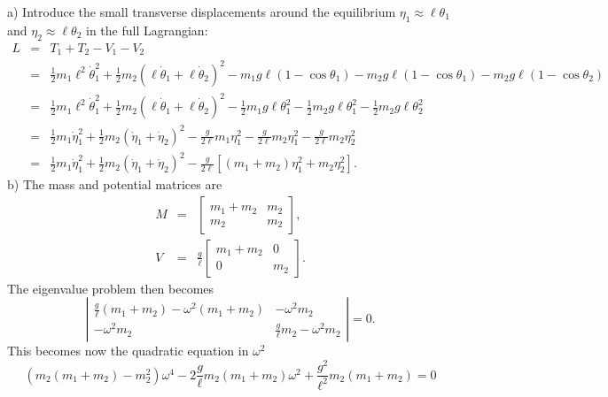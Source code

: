 \documentclass[letterpaper,11pt]{article}
\begin{document}
a) Introduce the small transverse displacements around the equilibrium $\eta_1 \approx \ell\theta_1$ and $\eta_2 \approx \ell\theta_2$ in the full Lagrangian:
\begin{eqnarray*}
 L & = & T_1 + T_2 - V_1 - V_2 \\
 & = & \frac{1}{2}m_1 \ell^2\dot\theta_1^2 + \frac{1}{2}m_2 (\ell\dot\theta_1 + \ell\dot\theta_2)^2 - m_1g\ell(1 - \cos\theta_1) - m_2g\ell(1 - \cos\theta_1) - m_2g\ell(1 - \cos\theta_2) \\
 & = & \frac{1}{2}m_1 \ell^2\dot\theta_1^2 + \frac{1}{2}m_2 (\ell\dot\theta_1 + \ell\dot\theta_2)^2 - \frac{1}{2}m_1g\ell\theta_1^2 - \frac{1}{2}m_2g\ell\theta_1^2 - \frac{1}{2}m_2g\ell\theta_2^2 \\
 & = & \frac{1}{2}m_1 \dot\eta_1^2 + \frac{1}{2}m_2 (\dot\eta_1 + \dot\eta_2)^2 - \frac{g}{2\ell}m_1\eta_1^2 - \frac{g}{2\ell}m_2\eta_1^2 - \frac{g}{2\ell}m_2\eta_2^2 \\
 & = & \frac{1}{2}m_1 \dot\eta_1^2 + \frac{1}{2}m_2 (\dot\eta_1 + \dot\eta_2)^2 - \frac{g}{2\ell}\left[ (m_1+m_2)\eta_1^2 + m_2\eta_2^2\right].
\end{eqnarray*}
b) The mass and potential matrices are
\begin{eqnarray*}
 M & = & \left[ \begin{array}{cc}
          m_1 + m_2 & m_2 \\
          m_2 & m_2
         \end{array} \right], \\
 V & = & \frac{g}{\ell}
         \left[ \begin{array}{cc}
          m_1 + m_2 & 0 \\
          0 & m_2 
         \end{array} \right].
\end{eqnarray*}
The eigenvalue problem then becomes
\begin{equation*}
 \left| \begin{array}{cc}
  \frac{g}{\ell} (m_1 + m_2) - \omega^2 (m_1 + m_2) & - \omega^2 m_2 \\
  - \omega^2 m_2 & \frac{g}{\ell} m_2 - \omega^2 m_2
 \end{array} \right| = 0.
\end{equation*}
This becomes now the quadratic equation in $\omega^2$
\begin{equation*}
 \left( m_2 (m_1 + m_2) - m_2^2 \right) \omega^4 - 2 \frac{g}{\ell} m_2 (m_1 + m_2) \omega^2 + \frac{g^2}{\ell^2} m_2 (m_1 + m_2) = 0
\end{equation*}
\end{document}
